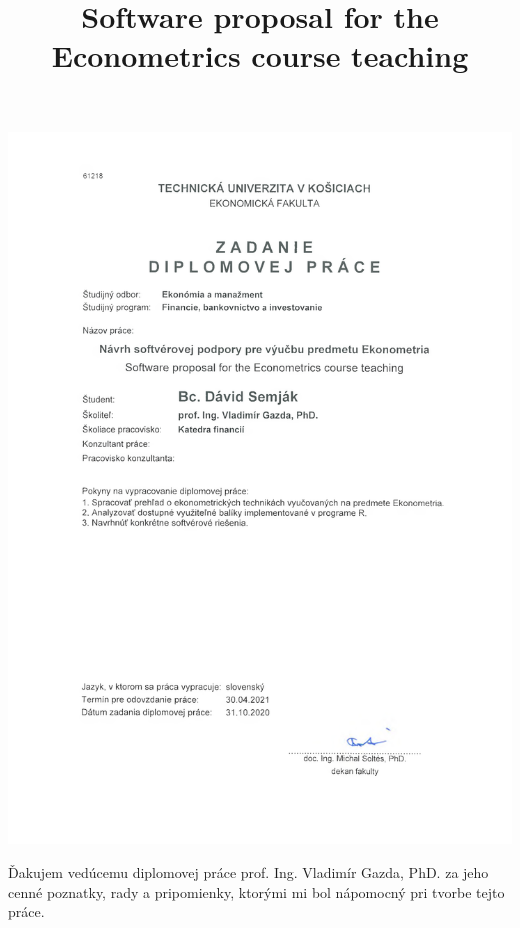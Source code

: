 \documentclass[]{tukediphc}
\title{Software proposal for the Econometrics course teaching}
\begin{document}
\renewcommand{\figurename}{Obrázok}	
\renewcommand\theHfigure{\theHsection.\arabic{figure}}
\renewcommand\theHtable{\theHsection.\arabic{table}}


\prvastrana

\titulnastrana

\abstraktsk %

\abstrakteng %

\kabstrakt %


\includegraphics[width = \textwidth]{obrazky/0.png}


\newpage

\cestnevyhlasenie


\podakovanie
Ďakujem vedúcemu diplomovej práce prof. Ing. Vladimír Gazda, PhD. za jeho cenné poznatky, rady a pripomienky, ktorými mi bol nápomocný pri tvorbe tejto práce.
\kpodakovania
\end{document}
